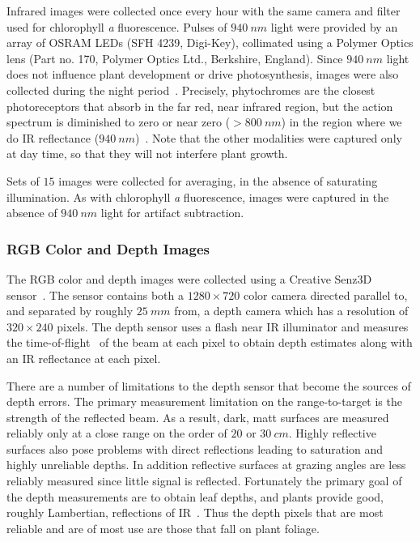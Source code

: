 Infrared images were collected once every hour with the same camera and filter used for chlorophyll {\it a} fluorescence.
Pulses of $940~nm$ light were provided by an array of OSRAM LEDs (SFH 4239, Digi-Key), collimated using a Polymer Optics lens (Part no. 170, Polymer Optics Ltd., Berkshire, England).
Since $940~nm$ light does not influence plant development or drive photosynthesis, images were also collected during the night period~\cite{eskins1992light}.
%
Precisely, phytochromes are the closest photoreceptors that absorb in the far red, near infrared region, but the action spectrum is diminished to zero or near zero ($>800~nm$) in the region where we do IR reflectance ($940~nm$)~\cite{butler1964actton}.
%
Note that the other modalities were captured only at day time, so that they will not interfere plant growth.



Sets of $15$ images were collected for averaging, in the absence of saturating illumination.
As with chlorophyll {\it a} fluorescence, images were captured in the absence of $940~nm$ light for artifact subtraction.



\subsubsection{RGB Color and Depth Images} %

The RGB color and depth images were collected using a Creative Senz3D sensor~\cite{nguyen2015vietnamese}. The sensor contains both a $1280 \times 720$ color camera directed parallel to, and separated by roughly $25~mm$ from, a depth camera which has a resolution of $320\times240$ pixels.
The depth sensor uses a flash near IR illuminator and measures the time-of-flight~\cite{Hansard2013} of the beam at each pixel to obtain depth estimates along with an IR reflectance at each pixel. 

There are a number of limitations to the depth sensor that become the sources of depth errors.
The primary measurement limitation on the range-to-target is the strength of the reflected beam.
As a result, dark, matt surfaces are measured reliably only at a close range on the order of $20$ or $30~cm$.
Highly reflective surfaces also pose problems with direct reflections leading to saturation and highly unreliable depths.
In addition reflective surfaces at grazing angles are less reliably measured since little signal is reflected.
Fortunately the primary goal of the depth measurements are to obtain leaf depths, and plants provide good, roughly Lambertian, reflections of IR~\cite{Chelle2006219}.  Thus the depth pixels that are most reliable and are of most use are those that fall on plant foliage.

